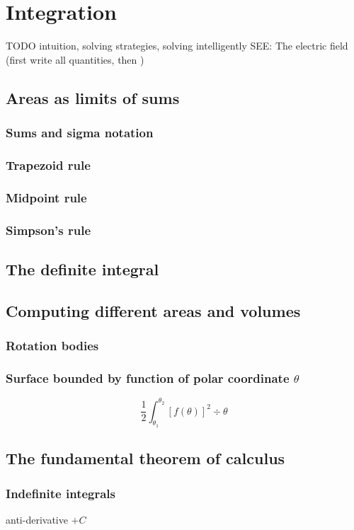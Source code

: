 \section{Integration}
TODO intuition, solving strategies, solving intelligently 
SEE: The electric field (first write all quantities, then )

\subsection{Areas as limits of sums}
\subsubsection{Sums and sigma notation}
\subsubsection{Trapezoid rule}
\subsubsection{Midpoint rule}
\subsubsection{Simpson's rule}

\subsection{The definite integral}
\subsection{Computing different areas and volumes}
\subsubsection{Rotation bodies}
\subsubsection{Surface bounded by function of polar coordinate $\theta$}
\[ \frac{1}{2}\int_{\theta_1}^{\theta_2}[f(\theta)]^2\div{\theta} \]

\subsection{The fundamental theorem of calculus}
\subsubsection{Indefinite integrals}
anti-derivative $+C$
